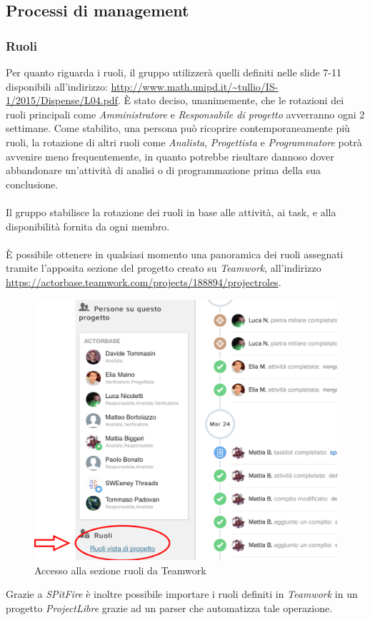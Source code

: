 \documentclass[a4paper]{article}
\begin{document}
	\subsection{Processi di management}
	\subsubsection{Ruoli}
		Per quanto riguarda i ruoli, il gruppo utilizzerà quelli definiti nelle slide 7-11 disponibili all'indirizzo:
		\url{http://www.math.unipd.it/~tullio/IS-1/2015/Dispense/L04.pdf}. È stato deciso, unanimemente, che le rotazioni dei ruoli principali
		come \emph{Amministratore} e \emph{Responsabile di progetto} avverranno ogni 2 settimane. Come stabilito, una persona può ricoprire
		contemporaneamente più ruoli, la rotazione di altri ruoli come \emph{Analista}, \emph{Progettista} e \emph{Programmatore} potrà avvenire
		meno frequentemente, in quanto potrebbe risultare dannoso dover abbandonare un'attività di analisi o di programmazione prima della sua
		conclusione.
\\ \\
		Il gruppo stabilisce la rotazione dei ruoli in base alle attività, ai task, e alla disponibilità fornita da ogni membro.
\\ \\
		È possibile ottenere in qualsiasi momento una panoramica dei ruoli assegnati tramite l'apposita sezione del
		progetto creato su \emph{Teamwork}, all'indirizzo\\ \url{https://actorbase.teamwork.com/projects/188894/projectroles}. 
	\begin{figure}[H]
		\centering
		\includegraphics[scale=0.5]{ruoli.png}
		\caption{Accesso alla sezione ruoli da Teamwork}
	\end{figure}
		Grazie a \emph{SPitFire} è inoltre possibile importare i ruoli definiti in \emph{Teamwork} in un progetto \emph{ProjectLibre} grazie ad un parser che automatizza tale operazione.
\end{document}
